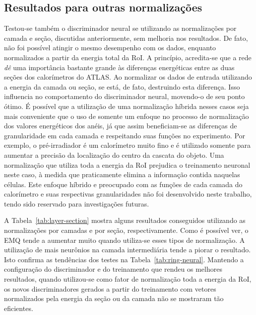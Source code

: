 \subsection{Resultados para outras normalizações}

Testou-se também o discriminador neural se utilizando as normalizações por
camada e seção, discutidas anteriormente, sem melhoria nos resultados. De
fato, não foi possível atingir o mesmo desempenho com os dados, enquanto
normalizados a partir da energia total da RoI. A princípio, acredita-se que a
rede \emph{dê} uma importância bastante grande às diferenças energéticas entre
as duas seções dos calorímetros do ATLAS. Ao normalizar os dados de entrada
utilizando a energia da camada ou seção, se está, de fato, destruindo esta
diferença. Isso influencia no comportamento do discriminador neural, movendo-o
de seu ponto ótimo. É possível que a utilização de uma normalização híbrida
\cite{seixas:sp} nesses casos seja mais conveniente que o uso de somente um
enfoque no processo de normalização dos valores energéticos dos anéis, já que
assim beneficiam-se as diferenças de granularidade em cada camada e
respeitando suas funções no experimento. Por exemplo, o pré-irradiador é um
calorímetro muito fino e é utilizado somente para aumentar a precisão da
localização do centro da cascata do objeto. Uma normalização que utiliza toda
a energia da RoI prejudica o treinamento neuronal neste caso, à medida que
praticamente elimina a informação contida naquelas células. Este enfoque
híbrido e preocupado com as funções de cada camada do calorímetro e suas
respectivas granularidades não foi desenvolvido neste trabalho, tendo sido
reservado para investigações futuras.

A Tabela~\ref{tab:layer-section} mostra alguns resultados conseguidos
utilizando as normalizações por camadas e por seção, respectivamente. Como é
possível ver, o EMQ tende a aumentar muito quando utiliza-se esses tipos de
normalização. A utilização de mais neurônios na camada intermediária tende a
piorar o resultado. Isto confirma as tendências dos testes na
Tabela~\ref{tab:ring-neural}. Mantendo a configuração do discriminador e do
treinamento que rendeu os melhores resultados, quando utilizou-se como fator
de normalização toda a energia da RoI, os novos discriminadores gerados a
partir do treinamento com vetores normalizados pela energia da seção ou da
camada não se mostraram tão eficientes.

